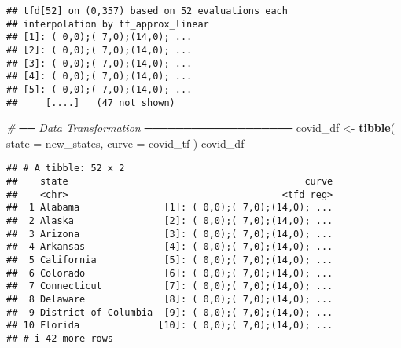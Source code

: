 \documentclass[
]{article}
\newenvironment{Shaded}{\begin{snugshade}}{\end{snugshade}}
\newcommand{\AttributeTok}[1]{\textcolor[rgb]{0.13,0.29,0.53}{#1}}
\newcommand{\CommentTok}[1]{\textcolor[rgb]{0.56,0.35,0.01}{\textit{#1}}}
\newcommand{\FunctionTok}[1]{\textcolor[rgb]{0.13,0.29,0.53}{\textbf{#1}}}
\newcommand{\NormalTok}[1]{#1}
\newcommand{\OtherTok}[1]{\textcolor[rgb]{0.56,0.35,0.01}{#1}}
\begin{document}
\begin{verbatim}
## tfd[52] on (0,357) based on 52 evaluations each
## interpolation by tf_approx_linear 
## [1]: ( 0,0);( 7,0);(14,0); ...
## [2]: ( 0,0);( 7,0);(14,0); ...
## [3]: ( 0,0);( 7,0);(14,0); ...
## [4]: ( 0,0);( 7,0);(14,0); ...
## [5]: ( 0,0);( 7,0);(14,0); ...
##     [....]   (47 not shown)
\end{verbatim}

\begin{Shaded}
\begin{Highlighting}[]
\CommentTok{\# ── Data Transformation ───────────────────}
\NormalTok{covid\_df }\OtherTok{\textless{}{-}} \FunctionTok{tibble}\NormalTok{(}
  \AttributeTok{state =}\NormalTok{ new\_states,}
  \AttributeTok{curve =}\NormalTok{ covid\_tf}
\NormalTok{)}
\NormalTok{covid\_df}
\end{Highlighting}
\end{Shaded}

\begin{verbatim}
## # A tibble: 52 x 2
##    state                                          curve
##    <chr>                                      <tfd_reg>
##  1 Alabama               [1]: ( 0,0);( 7,0);(14,0); ...
##  2 Alaska                [2]: ( 0,0);( 7,0);(14,0); ...
##  3 Arizona               [3]: ( 0,0);( 7,0);(14,0); ...
##  4 Arkansas              [4]: ( 0,0);( 7,0);(14,0); ...
##  5 California            [5]: ( 0,0);( 7,0);(14,0); ...
##  6 Colorado              [6]: ( 0,0);( 7,0);(14,0); ...
##  7 Connecticut           [7]: ( 0,0);( 7,0);(14,0); ...
##  8 Delaware              [8]: ( 0,0);( 7,0);(14,0); ...
##  9 District of Columbia  [9]: ( 0,0);( 7,0);(14,0); ...
## 10 Florida              [10]: ( 0,0);( 7,0);(14,0); ...
## # i 42 more rows
\end{verbatim}
\end{document}
